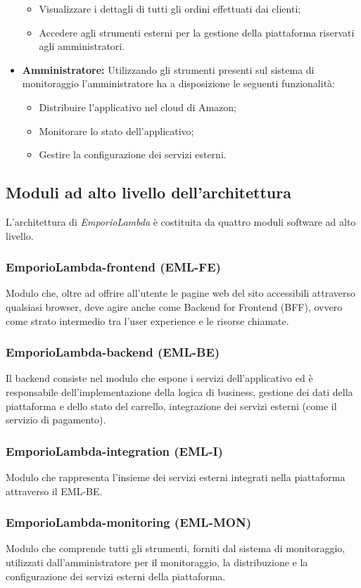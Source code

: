 \begin{itemize}
\begin{itemize}
	\item Visualizzare i dettagli di tutti gli ordini effettuati dai clienti;
	\item Accedere agli strumenti esterni per la gestione della piattaforma riservati agli amministratori.
	\end{itemize}
\item \textbf{Amministratore:} Utilizzando gli strumenti presenti sul sistema di monitoraggio l'amministratore ha a disposizione le seguenti funzionalità:
	\begin{itemize}
	\item Distribuire l'applicativo nel cloud di Amazon;
	\item Monitorare lo stato dell'applicativo;
	\item Gestire la configurazione dei servizi esterni.
	\end{itemize}
\end{itemize}
\subsection{Moduli ad alto livello dell'architettura}
L'architettura di \textit{EmporioLambda} è costituita da quattro moduli software ad alto livello.
\subsubsection{EmporioLambda-frontend (EML-FE)}
Modulo che, oltre ad offrire all'utente le pagine web del sito accessibili attraverso qualsiasi browser, deve agire anche come Backend for Frontend (BFF), ovvero come strato intermedio tra l'user experience e le risorse chiamate.
\subsubsection{EmporioLambda-backend (EML-BE)}
Il backend consiste nel modulo che espone i servizi dell'applicativo ed è responsabile dell'implementazione della logica di business, gestione dei dati della piattaforma e dello stato del carrello, integrazione dei servizi esterni (come il servizio di pagamento).
\subsubsection{EmporioLambda-integration (EML-I)}
Modulo che rappresenta l'insieme dei servizi esterni integrati nella piattaforma attraverso il EML-BE.
\subsubsection{EmporioLambda-monitoring (EML-MON)}
Modulo che comprende tutti gli strumenti, forniti dal sistema di monitoraggio, utilizzati dall'amministratore per il monitoraggio, la distribuzione e la configurazione dei servizi esterni della piattaforma.
